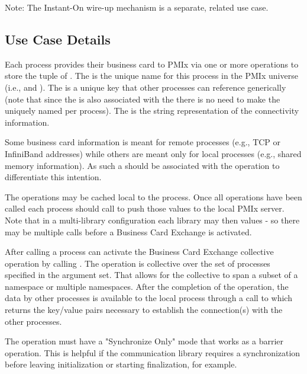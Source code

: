 Note: The Instant-On wire-up mechanism is a separate, related use case.

\subsection{Use Case Details}

Each process provides their business card to PMIx via one or more  operations to store the tuple of . The  is the unique name for this process in the \ac{PMIx} universe (i.e.,  and ). The  is a unique key that other processes can reference generically (note that since the  is also associated with the  there is no need to make the  uniquely named per process). The  is the string representation of the connectivity information.

Some business card information is meant for remote processes (e.g., TCP or InfiniBand addresses) while others are meant only for local processes (e.g., shared memory information). As such a  should be associated with the  operation to differentiate this intention.

The  operations may be cached local to the process. Once all  operations have been called each process should call  to push those values to the local PMIx server. Note that in a multi-library configuration each library may  then  values - so there may be multiple  calls before a Business Card Exchange is activated.

After calling  a process can activate the Business Card Exchange collective operation by calling . The  operation is collective over the set of processes specified in the argument set. That allows for the collective to span a subset of a namespace or multiple namespaces. After the completion of the  operation, the data  by other processes is available to the local process through a call to  which returns the key/value pairs necessary to establish the connection(s) with the other processes.

The  operation must have a "Synchronize Only" mode that works as a barrier operation. This is helpful if the communication library requires a synchronization before leaving initialization or starting finalization, for example.

